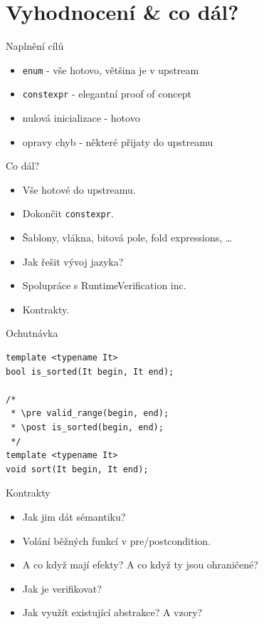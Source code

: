 \documentclass[11pt]{beamer}
\begin{document}
\section{Vyhodnocení \& co dál?}

\begin{frame}{Naplnění cílů}
\begin{itemize}
\pause \item \texttt{enum} - vše hotovo, většina je v upstream
\pause \item \texttt{constexpr} - elegantní proof of concept
\pause \item nulová inicializace - hotovo
\pause \item opravy chyb - některé přijaty do upstreamu
\end{itemize}
\end{frame}

\begin{frame}{Co dál?}
\begin{itemize}
\pause \item Vše hotové do upstreamu.
\pause \item Dokončit \texttt{constexpr}.
\pause \item Šablony, vlákna, bitová pole, fold expressions, \ldots
\pause \item Jak řešit vývoj jazyka?
\pause \item Spolupráce s RuntimeVerification inc.
\pause \item Kontrakty.
\end{itemize}
\end{frame}


\begin{frame}[fragile=singleslide]{Ochutnávka}
\begin{lstlisting}
template <typename It>
bool is_sorted(It begin, It end);

/*
 * \pre valid_range(begin, end);
 * \post is_sorted(begin, end);
 */
template <typename It>
void sort(It begin, It end);
\end{lstlisting}
\end{frame}


\begin{frame}{Kontrakty}
\begin{itemize}
\pause \item Jak jim dát sémantiku?
\pause \item Volání běžných funkcí v pre/postcondition.
\pause \item A co když mají efekty? A co když ty jsou ohraničené?
\pause \item Jak je verifikovat?
\pause \item Jak využít existující abstrakce? A vzory?
\end{itemize}
\end{frame}

\end{document}
